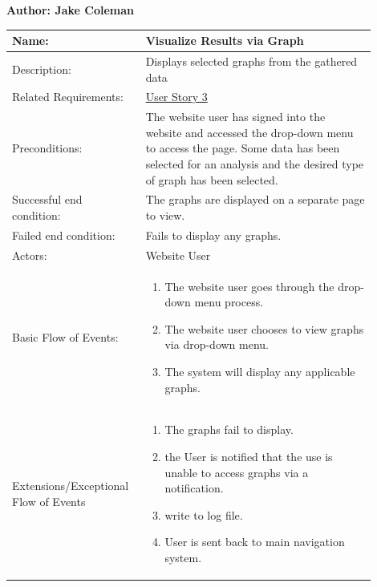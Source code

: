 \documentclass[11pt]{article}
\begin{document}
\begin{table}[!ht]
\begin{center}
\textbf{Author: Jake Coleman}
\vspace*{1em}

\begin{tabular}{p{0.30\linewidth}p{0.60\linewidth}}
	Name: & Visualize Results via Graph\\\hline
	Description: & Displays selected graphs from the gathered data\\\hline
	Related Requirements:& \hyperlink{us3}{User Story 3}\\\hline
	Preconditions:& The website user has signed into the website and accessed the drop-down menu to access the page. Some data has been selected for an analysis and the desired type of graph has been selected.\\\hline
	Successful end condition:& The graphs are displayed on a separate page to view.\\\hline
	Failed end condition:& Fails to display any graphs.\\\hline
	Actors:& Website User\\\hline
	Basic Flow of Events: & \begin{enumerate}
	\item The website user goes through the drop-down menu process.
	\item The website user chooses to view graphs via drop-down menu.
	\item The system will display any applicable graphs.
	\end{enumerate}\\\hline
	Extensions/Exceptional Flow of Events & \begin{enumerate}
	\item The graphs fail to display.
	\item the User is notified that the use is unable to access graphs via a notification.
	\item write to log file.
	\item User is sent back to main navigation system.
	\end{enumerate}
\end{tabular}
\label{des:vis_res}	
\end{center}
\end{table}
\end{document}
